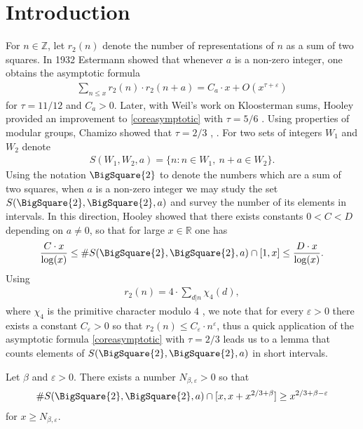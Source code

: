 \documentclass[12pt]{amsart}
\newcommand{\1}{\mathmybb{1}}
\begin{document}
\section{Introduction}
For $n \in \mathbb{Z}$, let $r_{2}(n)$ denote the number of representations of $n$ as a sum of two squares. In 1932 Estermann \cite{Estermann} showed that whenever $a$ is a non-zero integer, one obtains the asymptotic formula
\begin{align}
\label{coreasymptotic}
\sum_{n \leq x}r_{2}(n)\cdot r_{2}(n+a) = C_{a}\cdot x + O(x^{\tau + \varepsilon})
\end{align}
for $\tau = 11/12$ and $C_{a} > 0$. Later, with Weil's work on Kloosterman sums, Hooley provided an improvement to \eqref{coreasymptotic} with $\tau = 5/6$ \cite[p.282]{Hooley2}. Using properties of modular groups, Chamizo showed that $\tau = 2/3$ \cite{Chamizo1}, \cite{Chamizo2}. For two sets of integers $W_{1}$ and $W_{2}$ denote
\begin{align*}
S(W_{1},W_{2},a) = \{n: n \in W_{1}, \ n+a\in W_{2}\}.
\end{align*}
Using the notation $\BigSquare{2}$ to denote the numbers which are a sum of two squares, when $a$ is a non-zero integer we may study the set $S(\BigSquare{2},\BigSquare{2},a)$ and survey the number of its elements in intervals. In this direction, Hooley \cite{Hooley} showed that there exists constants $0<C<D$ depending on $a\neq 0$, so that for large $x \in \mathbb{R}$ one has
\begin{align*}
\frac{C\cdot x }{\log(x)}\leq \# S(\BigSquare{2},\BigSquare{2},a)\cap[1,x] \leq \frac{D\cdot x}{ \log(x)}.
\end{align*}
Using
\begin{align}
\label{4repeqn}
r_{2}(n) = 4\cdot\sum_{d|n}\chi_{4}(d),
\end{align}
where $\chi_{4}$ is the primitive character modulo $4$ \cite[Eqn. 33]{Estermann}, we note that for every $\varepsilon > 0$ there exists a constant $C_{\varepsilon}>0$ so that $r_{2}(n) \leq C_{\varepsilon}\cdot n^{\varepsilon}$, thus a quick application of the asymptotic formula \eqref{coreasymptotic} with $\tau = 2/3$ leads us to a lemma that counts elements of $S(\BigSquare{2},\BigSquare{2},a)$ in short intervals.
\begin{lem}
\label{Chamizoconsequence}
Let $\beta$ and $\varepsilon > 0$. There exists a number $N_{\beta,\varepsilon}>0$ so that
\begin{align*}
\#S(\BigSquare{2},\BigSquare{2},a)\cap[x, x+x^{2/3+\beta}] \geq x^{2/3 + \beta - \varepsilon}
\end{align*}
for $x \geq N_{\beta,\varepsilon}$.
\end{lem}
\end{document}
